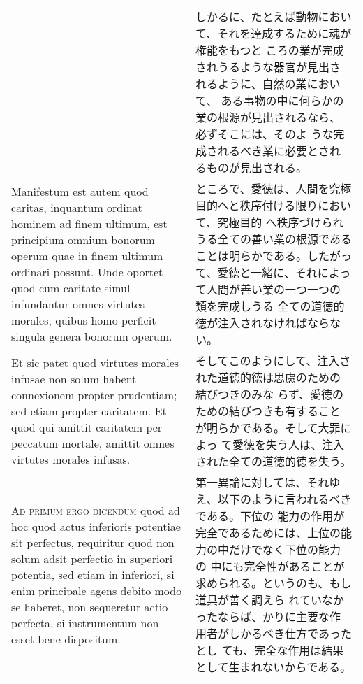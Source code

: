 \documentclass[10pt]{jsarticle}
\begin{document}
\begin{longtable}{p{21em}p{21em}}
&

 しかるに、たとえば動物において、それを達成するために魂が権能をもつと
 ころの業が完成されうるような器官が見出されるように、自然の業において、
 ある事物の中に何らかの業の根源が見出されるなら、必ずそこには、そのよ
 うな完成されるべき業に必要とされるものが見出される。
 
\\

 Manifestum est autem quod caritas, inquantum ordinat hominem ad finem
 ultimum, est principium omnium bonorum operum quae in finem ultimum
 ordinari possunt. Unde oportet quod cum caritate simul infundantur
 omnes virtutes morales, quibus homo perficit singula genera bonorum
 operum.
 
&

 ところで、愛徳は、人間を究極目的へと秩序付ける限りにおいて、究極目的
 へ秩序づけられうる全ての善い業の根源であることは明らかである。したがっ
 て、愛徳と一緒に、それによって人間が善い業の一つ一つの類を完成しうる
 全ての道徳的徳が注入されなければならない。

\\

 Et sic patet quod virtutes morales infusae non solum habent
 connexionem propter prudentiam; sed etiam propter caritatem. Et quod
 qui amittit caritatem per peccatum mortale, amittit omnes virtutes
 morales infusas.
 
&

 そしてこのようにして、注入された道徳的徳は思慮のための結びつきのみな
 らず、愛徳のための結びつきも有することが明らかである。そして大罪によっ
 て愛徳を失う人は、注入された全ての道徳的徳を失う。

\\



 {\scshape Ad primum ergo dicendum} quod ad hoc quod actus inferioris
 potentiae sit perfectus, requiritur quod non solum adsit perfectio in
 superiori potentia, sed etiam in inferiori, si enim principale agens
 debito modo se haberet, non sequeretur actio perfecta, si
 instrumentum non esset bene dispositum.

 
&

 第一異論に対しては、それゆえ、以下のように言われるべきである。下位の
 能力の作用が完全であるためには、上位の能力の中だけでなく下位の能力の
 中にも完全性があることが求められる。というのも、もし道具が善く調えら
 れていなかったならば、かりに主要な作用者がしかるべき仕方であったとし
 ても、完全な作用は結果として生まれないからである。


\end{longtable}
\end{document}
